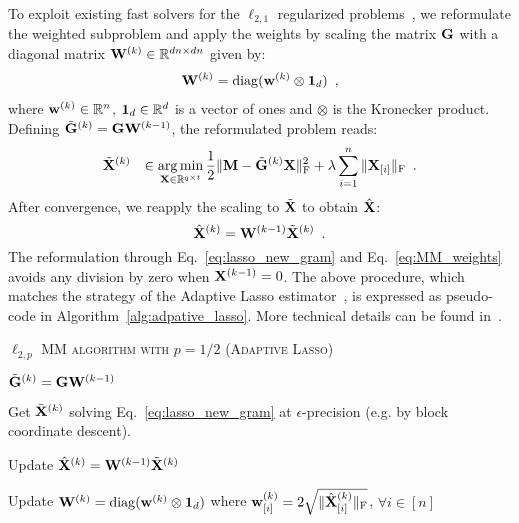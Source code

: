 To exploit existing fast solvers for the $\ell_{2,1}$ regularized problems~\cite{strohmeier-etal:16,Ndiaye_Fercoq_Gramfort_Salmon15}, we reformulate the weighted subproblem and apply the weights by scaling the matrix $\mathbf{G}$ with a diagonal matrix $\mathbf{W}^{(k)} \in \mathbb{R}^{dn \times dn}$ given by:
\begin{eqnarray} \label{eq:weights}
\mathbf{W}^{(k)} = \mathrm{diag}(\mathbf{w}^{(k)} \otimes \mathbf{1}_{d}) \enspace ,
\end{eqnarray}
where $\mathbf{w}^{(k)} \in \mathbb{R}^{n}$, $\mathbf{1}_{d}\in\mathbb{R}^d$ is a vector of ones and $\otimes$ is the Kronecker product.
Defining $\tilde{\mathbf{G}}^{(k)}=\mathbf{G} \mathbf{W}^{(k-1)}$, the reformulated problem reads:
\begin{eqnarray}\label{eq:lasso_new_gram}
\tilde{\mathbf{X}}^{(k)} &
 & \in \mathop{\mathrm{arg}\,\mathrm{min}}_{\mathbf{X}\in\mathbb{R}^{q \times t}} \frac{1}{2}\|{\mathbf{M} - \tilde{\mathbf{G}}^{(k)} \mathbf{X}}\|_{\rm F}^2  + \lambda \sum_{i=1}^n \|{\mathbf{X}_{[i]}}\|_{\rm F} \enspace .
\end{eqnarray}
After convergence, we reapply the scaling to $\tilde{\mathbf{X}}$ to obtain $\hat{\mathbf{X}}$:
\begin{equation}
    \label{eq:MM_weights}
    \hat{\mathbf{X}}^{(k)} = \mathbf{W}^{(k-1)} \tilde{\mathbf{X}}^{(k)} \enspace .
\end{equation}
The reformulation through Eq.~\ref{eq:lasso_new_gram} and Eq.~\ref{eq:MM_weights} avoids any division by zero when $\mathbf{X}^{(k-1)}=0$. The above procedure, which matches the strategy of the Adaptive Lasso estimator~\cite{Zou06}, is expressed as pseudo-code in Algorithm~\ref{alg:adpative_lasso}. More technical details can be found in~\cite[Algorithm 3]{strohmeier-etal:16}.


{\fontsize{4}{4}\selectfont
\begin{algorithm}[t]
\caption{\textsc{$\ell_{2,p}$ MM algorithm with $p=1/2$ (Adaptive Lasso)}}
    {
		$\tilde{\mathbf{G}}^{(k)} = \mathbf{G} \mathbf{W}^{(k-1)}$

		Get $\tilde{\mathbf{X}}^{(k)}$ solving Eq.~\ref{eq:lasso_new_gram} at $\epsilon$-precision (e.g. by block coordinate descent).

		Update $\hat{\mathbf{X}}^{(k)} = \mathbf{W}^{(k-1)} \tilde{\mathbf{X}}^{(k)}$

	    Update $\mathbf{W}^{(k)}=\mathrm{diag}(\mathbf{w}^{(k)} \otimes \mathbf{1}_{d})$ where $\mathbf{w}^{(k)}_{[i]} = 2 \sqrt{\|{\hat{\mathbf{X}}^{(k)}_{[i]}}\|_{\rm F}}$,  $\forall i\in [n]$


     }
\end{algorithm}
}


